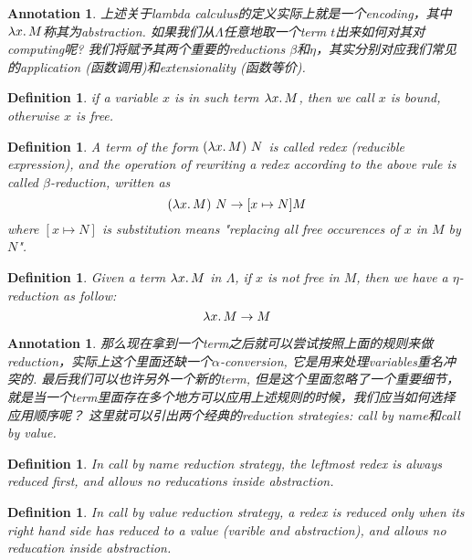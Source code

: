 \documentclass{article}
\newtheorem{definition}[theorem]{Definition}
\newtheorem{annotation}[theorem]{Annotation}
\newcommand{\lam}[2]{\ensuremath{\lambda #1\ldotp #2}} %
\begin{document}
\begin{annotation}
\rm 上述关于lambda calculus的定义实际上就是一个encoding，其中$\lam{x}{M}$称其为abstraction. 如果我们从$\Lambda$任意地取一个term $t$出来如何对其对computing呢? 我们将赋予其两个重要的reductions $\beta$和$\eta$，其实分别对应我们常见的application (函数调用)和extensionality (函数等价).
\end{annotation}

\begin{definition}
\rm if a variable $x$ is in such term $\lam{x}{M}$, then we call $x$ is bound, otherwise $x$ is free. 
\end{definition}

\begin{definition}
\rm A term of the form $(\lam{x}{M})~N$ is called redex (reducible expression), and the operation of rewriting a redex according to the above rule is called $\beta$-reduction, written as
\[
	(\lam{x}{M})~N \to [x \mapsto N] M
\]
where $[x \mapsto N]$ is substitution means "replacing all free occurences of $x$ in $M$ by $N$".
\end{definition}

\begin{definition}
\rm Given a term $\lam{x}{M}$ in $\Lambda$, if $x$ is not free in $M$, then we have a $\eta$-reduction as follow:
\[
	\lam{x}{M} \to M
\]  
\end{definition}

\begin{annotation}
\rm 那么现在拿到一个term之后就可以尝试按照上面的规则来做reduction，实际上这个里面还缺一个$\alpha$-conversion, 它是用来处理variables重名冲突的. 最后我们可以也许另外一个新的term, 但是这个里面忽略了一个重要细节，就是当一个term里面存在多个地方可以应用上述规则的时候，我们应当如何选择应用顺序呢？ 这里就可以引出两个经典的reduction strategies: \emph{call by name}和\emph{call by value}.
\end{annotation}

\begin{definition}
\rm In \emph{call by name} reduction strategy, the leftmost redex is always reduced first, and allows no reducations inside abstraction.  
\end{definition}

\begin{definition}
\rm In \emph{call by value} reduction strategy, a redex is reduced only when its right hand side has reduced to a \emph{value} (varible and abstraction), and allows no reducation inside abstraction.
\end{definition}
\end{document}

